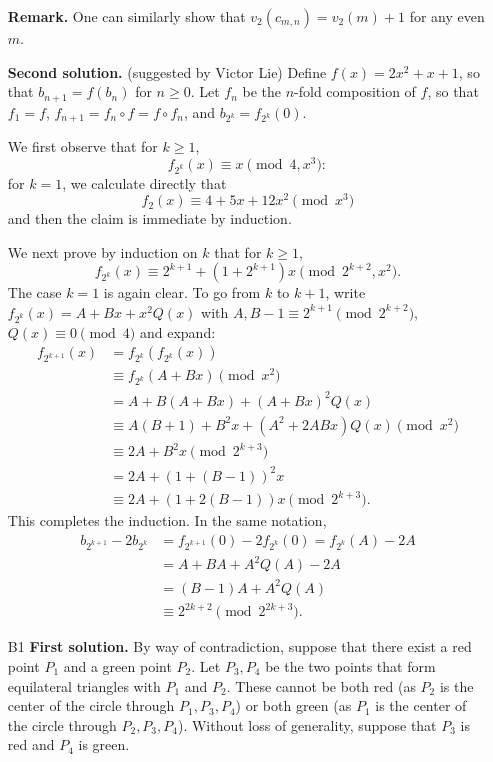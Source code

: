 \documentclass[amssymb,twocolumn,pra,10pt,aps]{revtex4-1}
\begin{document}
\begin{itemize}
\noindent
\textbf{Remark.}
One can similarly show that $v_2(c_{m,n}) = v_2(m) + 1$ for any even $m$.

\noindent
\textbf{Second solution.}
(suggested by Victor Lie)
Define $f(x) = 2x^2 + x+1$, so that $b_{n+1}= f(b_n)$ for $n \geq 0$.
Let $f_n$ be the $n$-fold composition of $f$, so that $f_1 = f$, $f_{n+1} = f_n \circ f = f \circ f_n$, and $b_{2^k} = f_{2^k}(0)$.

We first observe that for $k \geq 1$,
\[
f_{2^k}(x) \equiv x \pmod{4, x^3}:
\]
for $k=1$, we calculate directly that
\[
f_2(x) \equiv 4 + 5x+12x^2 \pmod{x^3}
\]
and then the claim is immediate by induction.

We next prove by induction on $k$ that for $k \geq 1$,
\[
f_{2^k}(x) \equiv 2^{k+1} + (1 + 2^{k+1} )x \pmod{2^{k+2}, x^2}.
\]
The case $k=1$ is again clear. To go from $k$ to $k+1$, write 
$f_{2^k}(x) = A + Bx + x^2 Q(x)$ with $A,B-1 \equiv 2^{k+1} \pmod{2^{k+2}}$, $Q(x) \equiv 0 \pmod{4}$ and expand:
\begin{align*}
f_{2^{k+1}}(x) &= f_{2^k}(f_{2^k}(x)) \\
&\equiv f_{2^k}(A + Bx) \pmod{x^2} \\
&= A + B(A+Bx) + (A+Bx)^2 Q(x) \\
&\equiv A(B+1) + B^2x + (A^2+2ABx) Q(x) \pmod{x^2} \\
&\equiv 2A + B^2 x \pmod{2^{k+3}} \\
&= 2A + (1 + (B-1))^2 x \\
&\equiv 2A + (1+ 2(B-1)) x \pmod{2^{k+3}}.
\end{align*}
This completes the induction. In the same notation,
\begin{align*}
b_{2^{k+1}} - 2b_{2^k} &= f_{2^{k+1}}(0) - 2f_{2^k}(0) = f_{2^k}(A) - 2A \\
&= A + BA + A^2 Q(A) - 2A \\
&= (B-1)A + A^2 Q(A) \\
&\equiv 2^{2k+2} \pmod{2^{2k+3}}.
\end{align*}


\item[B1]
\noindent
\textbf{First solution.}
By way of contradiction, suppose that there exist a red point $P_1$ and a green point $P_2$.
Let $P_3, P_4$ be the two points that form equilateral triangles with $P_1$ and $P_2$.
These cannot be both red (as $P_2$ is the center of the circle through $P_1,P_3,P_4$)
or both green (as $P_1$ is the center of the circle through $P_2,P_3,P_4$). Without loss of generality, suppose that $P_3$ is red and $P_4$ is green.


\end{itemize}
\end{document}
